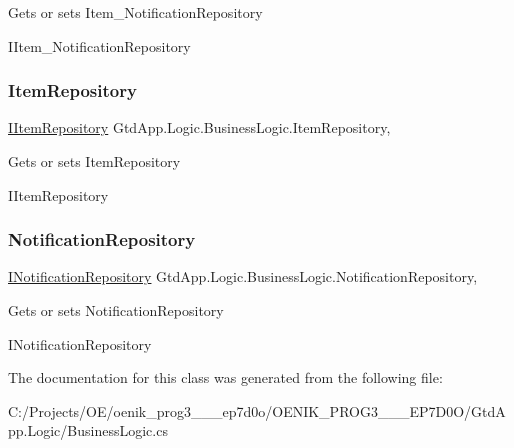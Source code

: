 Gets or sets Item\+\_\+\+Notification\+Repository 

I\+Item\+\_\+\+Notification\+Repository\mbox{\label{class_gtd_app_1_1_logic_1_1_business_logic_a51c7cd556dc40e5e0618b4820f325bf7}} 
\subsubsection{\texorpdfstring{Item\+Repository}{ItemRepository}}
{\footnotesize\ttfamily \mbox{\hyperlink{interface_gtd_app_1_1_repository_1_1_interfaces_1_1_i_item_repository}{I\+Item\+Repository}} Gtd\+App.\+Logic.\+Business\+Logic.\+Item\+Repository\hspace{0.3cm}{\ttfamily [get]}, {\ttfamily [set]}}



Gets or sets Item\+Repository 

I\+Item\+Repository\mbox{\label{class_gtd_app_1_1_logic_1_1_business_logic_ae714d48c3f6c70bffd5557237a441ca0}} 
\subsubsection{\texorpdfstring{Notification\+Repository}{NotificationRepository}}
{\footnotesize\ttfamily \mbox{\hyperlink{interface_gtd_app_1_1_repository_1_1_interfaces_1_1_i_notification_repository}{I\+Notification\+Repository}} Gtd\+App.\+Logic.\+Business\+Logic.\+Notification\+Repository\hspace{0.3cm}{\ttfamily [get]}, {\ttfamily [set]}}



Gets or sets Notification\+Repository 

I\+Notification\+Repository

The documentation for this class was generated from the following file\+:\begin{DoxyCompactItemize}
\item 
C\+:/\+Projects/\+O\+E/oenik\+\_\+prog3\+\_\+\_\+\_\+ep7d0o/\+O\+E\+N\+I\+K\+\_\+\+P\+R\+O\+G3\+\_\+\_\+\_\+\+E\+P7\+D0\+O/\+Gtd\+App.\+Logic/Business\+Logic.\+cs\end{DoxyCompactItemize}
